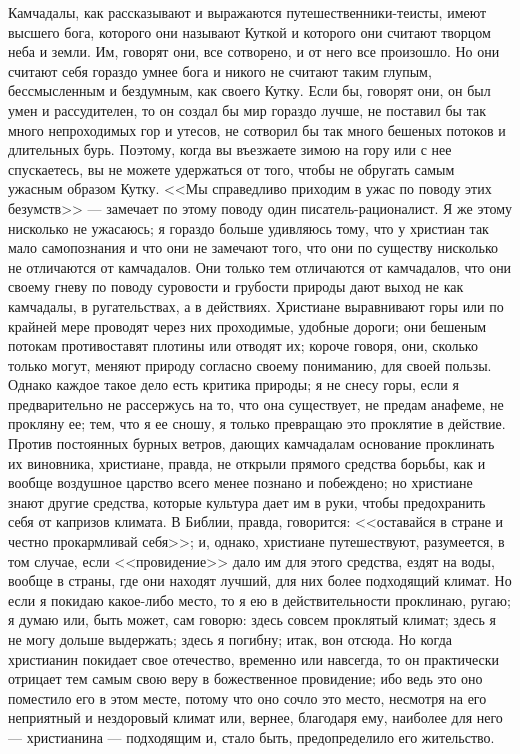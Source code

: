 \documentclass[12pt]{article}
\begin{document}
Камчадалы, как рассказывают и выражаются путешественники-теисты, имеют высшего бога, которого они называют Куткой и которого они считают творцом неба и земли. Им, говорят они, все сотворено, и от него все произошло. Но они считают себя гораздо умнее бога и никого не считают таким глупым, бессмысленным и бездумным, как своего Кутку. Если бы, говорят они, он был умен и рассудителен, то он создал бы мир гораздо лучше, не поставил бы так много непроходимых гор и утесов, не сотворил бы так много бешеных потоков и длительных бурь. Поэтому, когда вы въезжаете зимою на гору или с нее спускаетесь, вы не можете удержаться от того, чтобы не обругать самым ужасным образом Кутку. <<Мы справедливо приходим в ужас по поводу этих безумств>>  --- замечает по этому поводу один писатель-рационалист. Я же этому нисколько не ужасаюсь; я гораздо больше удивляюсь тому, что у христиан так мало самопознания и что они не замечают того, что они по существу нисколько не отличаются от камчадалов. Они только тем отличаются от камчадалов, что они своему гневу по поводу суровости и грубости природы дают выход не как камчадалы, в ругательствах, а в действиях. Христиане выравнивают горы или по крайней мере проводят через них проходимые, удобные дороги; они бешеным потокам противоставят плотины или отводят их; короче говоря, они, сколько только могут, меняют природу согласно своему пониманию, для своей пользы. Однако каждое такое дело есть критика природы; я не снесу горы, если я предварительно не рассержусь на то, что она существует, не предам анафеме, не прокляну ее; тем, что я ее сношу, я только превращаю это проклятие в действие. Против постоянных бурных ветров, дающих камчадалам основание проклинать их виновника, христиане, правда, не открыли прямого средства борьбы, как и вообще воздушное царство всего менее познано и побеждено; но христиане знают другие средства, которые культура дает им в руки, чтобы предохранить себя от капризов климата. В Библии, правда, говорится: <<оставайся в стране и честно прокармливай себя>>; и, однако, христиане путешествуют, разумеется, в том случае, если <<провидение>> дало им для этого средства, ездят на воды, вообще в страны, где они находят лучший, для них более подходящий климат. Но если я покидаю какое-либо место, то я ею в действительности проклинаю, ругаю; я думаю или, быть может, сам говорю: здесь совсем проклятый климат; здесь я не могу дольше выдержать; здесь я погибну; итак, вон отсюда. Но когда христианин покидает свое отечество, временно или навсегда, то он практически отрицает тем самым свою веру в божественное провидение; ибо ведь это оно поместило его в этом месте, потому что оно сочло это место, несмотря на его неприятный и нездоровый климат или, вернее, благодаря ему, наиболее для него --- христианина --- подходящим и, стало быть, предопределило его жительство. 
\end{document}
